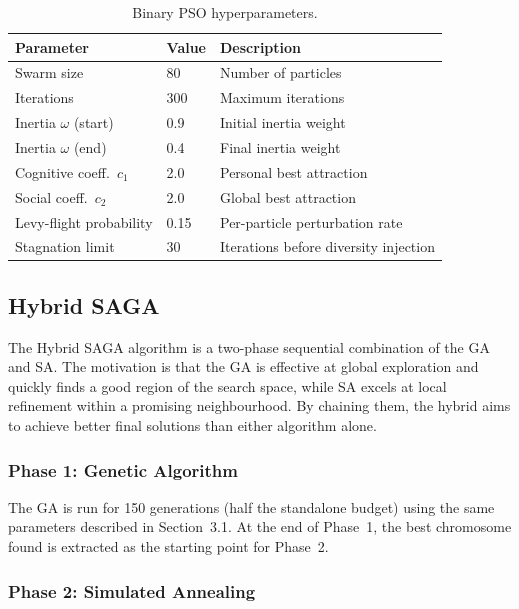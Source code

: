 \documentclass[12pt,a4paper]{article}
\begin{document}
\begin{table}[H]
  \centering
  \caption{Binary PSO hyperparameters.}
  \label{tab:pso_params}
  \begin{tabular}{lll}
    \toprule
    \textbf{Parameter} & \textbf{Value} & \textbf{Description} \\
    \midrule
    Swarm size            & 80           & Number of particles \\
    Iterations            & 300          & Maximum iterations \\
    Inertia $\omega$ (start) & 0.9       & Initial inertia weight \\
    Inertia $\omega$ (end)   & 0.4       & Final inertia weight \\
    Cognitive coeff.\ $c_1$ & 2.0        & Personal best attraction \\
    Social coeff.\ $c_2$    & 2.0        & Global best attraction \\
    Levy-flight probability & 0.15       & Per-particle perturbation rate \\
    Stagnation limit      & 30           & Iterations before diversity injection \\
    \bottomrule
  \end{tabular}
\end{table}

\subsection{Hybrid SAGA}

The Hybrid SAGA algorithm is a two-phase sequential combination of the GA and SA.
The motivation is that the GA is effective at global exploration and quickly finds a good region of the search space, while SA excels at local refinement within a promising neighbourhood.
By chaining them, the hybrid aims to achieve better final solutions than either algorithm alone.

\subsubsection*{Phase 1: Genetic Algorithm}

The GA is run for 150 generations (half the standalone budget) using the same parameters described in Section~3.1.
At the end of Phase~1, the best chromosome found is extracted as the starting point for Phase~2.

\subsubsection*{Phase 2: Simulated Annealing}
\end{document}
